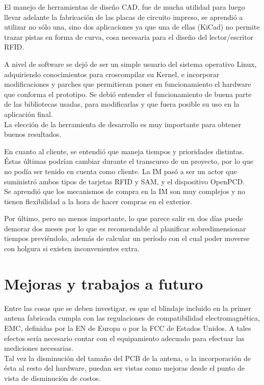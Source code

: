 \bigskip
El manejo de herramientas de diseño CAD, fue de mucha utilidad para luego
llevar adelante la fabricación de las placas de circuito impreso, se aprendió a utilizar
no sólo una, sino dos aplicaciones ya que una de ellas (KiCad) no permite trazar
pistas en forma de curva, cosa necesaria para el diseño del lector/escritor RFID.

\bigskip
A nivel de software se dejó de ser un simple usuario del sistema operativo
Linux, adquiriendo conocimientos para croscompilar su Kernel, e incorporar
modificaciones y parches que permitieran poner en funcionamiento el hardware
que conforma el prototipo. Se debió entender el funcionamiento de buena parte
de las bibliotecas usadas, para modificarlas y que fuera posible su uso en la 
aplicación final.\\
La elección de la herramienta de desarrollo es muy importante para obtener buenos resultados.

\bigskip
En cuanto al cliente, se entendió que maneja tiempos y prioridades distintas. Éstas últimas
podrían cambiar durante el transcurso de un proyecto, por lo que no podía ser 
tenido en cuenta como cliente. La IM pasó a ser un actor que suministró ambos tipos de
tarjetas RFID y SAM, y el dispositivo OpenPCD. \\
Se aprendió que los mecanismos de compra en la IM son muy complejos y no tienen flexibilidad
a la hora de hacer compras en el exterior.

\bigskip
Por último, pero no menos importante, lo que parece salir en dos días puede demorar dos meses por lo que es recomendable al planificar sobredimensionar tiempos previéndolo, además de calcular un período con el cual poder moverse con holgura si existen inconvenientes extra.



\section{Mejoras y trabajos a futuro}
Entre las cosas que se deben investigar, es que el blindaje incluido en la 
primer antena fabricada cumpla con las regulaciones de compatibilidad 
electromagnética, EMC, definidas por la EN de Europa o por la FCC de Estados 
Unidos. A tales efectos sería necesario contar con el equipamiento adecuado
para efectuar las mediciones necesarias.\\
Tal vez la disminución del tamaño del PCB de la antena, o la incorporación
de ésta al resto del hardware, puedan ser vistas como mejoras desde el 
punto de vista de disminución de costos.

